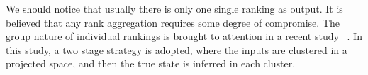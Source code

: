 \documentclass[sigconf]{acmart}
\begin{document}
We should notice that usually there is only one single ranking as output. It is believed that any rank aggregation requires some degree of compromise. The group nature of individual rankings is brought to attention in a recent study ~\cite{Wu2015Clustering}. In this study, a two stage strategy is adopted, where the inputs are clustered in a projected space, and then the true state is inferred in each cluster.


\end{document}
